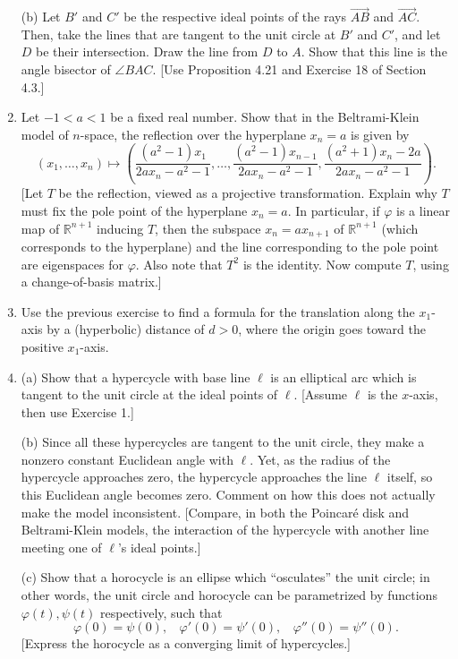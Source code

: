 \documentclass[leqno]{book}
\begin{document}
\begin{enumerate}
(b) Let $B'$ and $C'$ be the respective ideal points of the rays $\overset{\longrightarrow}{AB}$ and $\overset{\longrightarrow}{AC}$.  Then, take the lines that are tangent to the unit circle at $B'$ and $C'$, and let $D$ be their intersection.  Draw the line from $D$ to $A$.  Show that this line is the angle bisector of $\angle BAC$.  [Use Proposition 4.21 and Exercise 18 of Section 4.3.]

\item Let $-1<a<1$ be a fixed real number.  Show that in the Beltrami-Klein model of $n$-space, the reflection over the hyperplane $x_n=a$ is given by
$$(x_1,\dots,x_n)\mapsto\left(\frac{(a^2-1)x_1}{2ax_n-a^2-1},\dots,\frac{(a^2-1)x_{n-1}}{2ax_n-a^2-1},\frac{(a^2+1)x_n-2a}{2ax_n-a^2-1}\right).$$
[Let $T$ be the reflection, viewed as a projective transformation.  Explain why $T$ must fix the pole point of the hyperplane $x_n=a$.  In particular, if $\varphi$ is a linear map of $\mathbb R^{n+1}$ inducing $T$, then the subspace $x_n=ax_{n+1}$ of $\mathbb R^{n+1}$ (which corresponds to the hyperplane) and the line corresponding to the pole point are eigenspaces for $\varphi$.  Also note that $T^2$ is the identity.  Now compute $T$, using a change-of-basis matrix.]

\item Use the previous exercise to find a formula for the translation along the $x_1$-axis by a (hyperbolic) distance of $d>0$, where the origin goes toward the positive $x_1$-axis.

\item (a) Show that a hypercycle with base line $\ell$ is an elliptical arc which is tangent to the unit circle at the ideal points of $\ell$.  [Assume $\ell$ is the $x$-axis, then use Exercise 1.]

(b) Since all these hypercycles are tangent to the unit circle, they make a nonzero constant Euclidean angle with $\ell$.  Yet, as the radius of the hypercycle approaches zero, the hypercycle approaches the line $\ell$ itself, so this Euclidean angle becomes zero.  Comment on how this does not actually make the model inconsistent.  [Compare, in both the Poincar\'e disk and Beltrami-Klein models, the interaction of the hypercycle with another line meeting one of $\ell$'s ideal points.]

(c) Show that a horocycle is an ellipse which ``osculates'' the unit circle; in other words, the unit circle and horocycle can be parametrized by functions $\varphi(t),\psi(t)$ respectively, such that
$$\varphi(0)=\psi(0),~~~~\varphi'(0)=\psi'(0),~~~~\varphi''(0)=\psi''(0).$$
[Express the horocycle as a converging limit of hypercycles.]
\end{enumerate}
\end{document}
